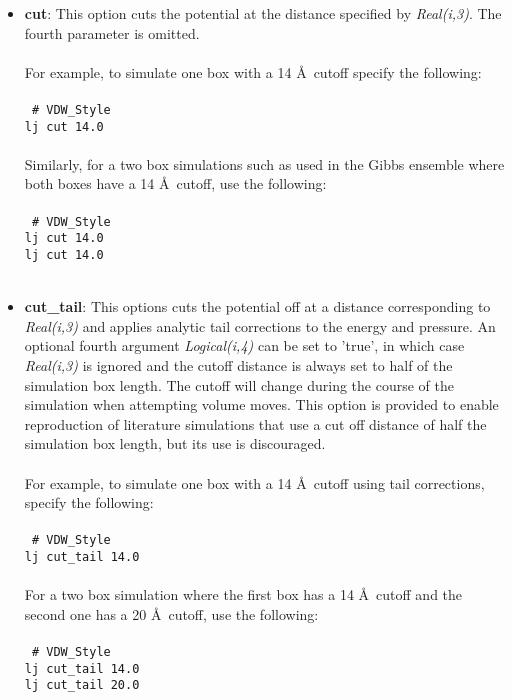 \begin{itemize}
\item \textbf{cut}: This option cuts the  potential at the distance
specified by \emph{Real(i,3)}. The fourth parameter is omitted. \\ \\
%
For example, to simulate one box with a 14 \AA\ cutoff specify the following:
\\ \\
\texttt{
\# VDW\_Style \\
lj cut 14.0 } \\ \\
%
Similarly, for a two box simulations such as used in the Gibbs
ensemble where both boxes have a 14 \AA\ cutoff, use the
following: \\ \\
\texttt{
\# VDW\_Style \\
lj cut 14.0 \\
lj cut 14.0 } \\ \\
%
\item \textbf{cut\_tail}: This options cuts the potential off at a distance
corresponding to \emph{Real(i,3)} and applies analytic tail
corrections to the energy and pressure. An optional fourth argument
\emph{Logical(i,4)} can be set
to 'true', in which case \emph{Real(i,3)} is ignored and the cutoff
distance is always set to half of the simulation box length. The
cutoff will change during the course of the simulation when attempting
volume moves.  This option is provided to enable reproduction of
literature simulations that use a cut off distance of half the
simulation box length, but its use is discouraged. \\ \\
%
For example, to simulate one box with a 14 \AA\ cutoff using tail
corrections, specify the following:
\\ \\
\texttt{
\# VDW\_Style \\
lj cut\_tail 14.0 } \\ \\
%
For a two box simulation where the first box has a 14 \AA\ cutoff and
the second one has a 20 \AA\ cutoff, use the
following:
\\ \\
\texttt{
\# VDW\_Style \\
lj cut\_tail 14.0 \\
lj cut\_tail 20.0 } \\ \\

\end{itemize}
